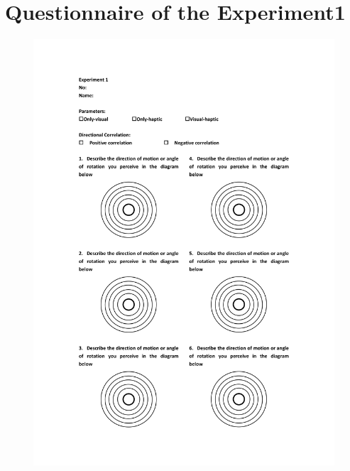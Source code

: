 \section{Questionnaire of the Experiment1}
\begin{figure}[h]
\centering
\includegraphics[width=1\textwidth,height=0.7\textheight]{A_thesis/appendix/Experiment1_questionnaire-1.png}
\end{figure}
\newpage


